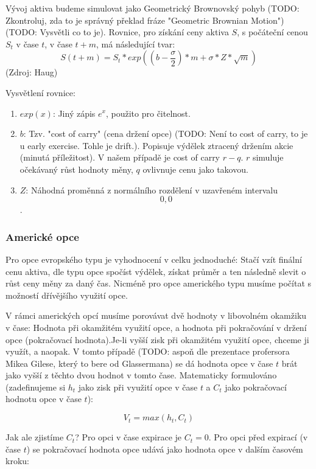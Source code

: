 \documentclass{article}
\begin{document}
  Vývoj aktiva budeme simulovat jako Geometrický Brownovský pohyb (TODO: Zkontroluj, zda to je správný překlad fráze "Geometric Brownian Motion") (TODO: Vysvětli co to je). Rovnice, pro získání ceny aktiva $S$, s počáteční cenou $S_t$ v čase $t$, v čase $t + m$, má následující tvar:
  $$ S(t + m) = S_t * exp((b - \frac{\sigma}{2}) * m + \sigma * Z * \sqrt{m}) $$ (Zdroj: Haug)
  
  Vysvětlení rovnice:
  \begin{enumerate}
    \item{\textbf{$exp(x)$}: Jiný zápis $e^x$, použito pro čitelnost.}
    \item{\textbf{$b$}: Tzv. "cost of carry" (cena držení opce) (TODO: Není to cost of carry, to je u early exercise. Tohle je drift.). Popisuje výdělek ztracený držením akcie (minutá příležitost). V našem případě je cost of carry $r - q$. $r$ simuluje očekávaný růst hodnoty měny, $q$ ovlivnuje cenu jako takovou.}
    \item{\textbf{$Z$}: Náhodná proměnná z normálního rozdělení v uzavřeném intervalu \[0, 0\].}
  \end{enumerate}

  \subsubsection{Americké opce}

  Pro opce evropského typu je vyhodnocení v celku jednoduché: Stačí vzít finální cenu aktiva, dle typu opce spočíst výdělek, získat průměr a ten následně slevit o růst ceny měny za daný čas. Nicméně pro opce amerického typu musíme počítat s možností dřívějšího využití opce.

  V rámci amerických opcí musíme porovávat dvě hodnoty v libovolném okamžiku v čase: Hodnota při okamžitém využití opce, a hodnota při pokračování v držení opce (pokračovací hodnota).Je-li vyšší zisk při okamžitém využití opce, chceme ji využít, a naopak. V tomto případě (TODO: aspoň dle prezentace profersora Mikea Gilese, který to bere od Glassermana) se dá hodnota opce v čase $t$ brát jako vyšší z těchto dvou hodnot v tomto čase. Matematicky formulováno (zadefinujeme si $h_t$ jako zisk při využití opce v čase $t$ a $C_t$ jako pokračovací hodnotu opce v čase $t$):
  
  $$ V_{t} = max(h_t, C_t) $$

  Jak ale zjistíme $C_t$? Pro opci v čase expirace je $C_t = 0$. Pro opci před expirací (v čase $t$) se pokračovací hodnota opce udává jako hodnota opce v dalším časovém kroku:
\end{document}
